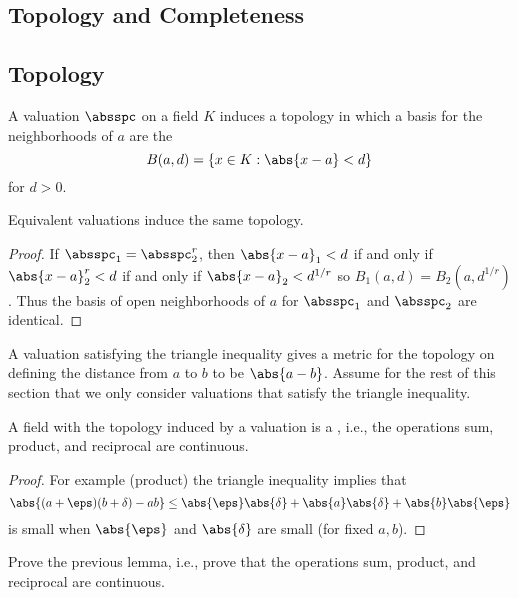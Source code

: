 \documentclass[11pt]{book}
\begin{document}
\begin{ch}
\chapter{Topology and  Completeness}

\section{Topology}\label{sec:topology}
A valuation $\absspc$ on a field $K$ induces a topology in which a
basis for the neighborhoods of $a$ are the 
$$
  B(a,d) = \{x\in K : \abs{x-a} < d\}
$$
for $d>0$.
\begin{lemma}
Equivalent valuations induce the same topology.
\end{lemma}
\begin{proof}
If $\absspc_1=\absspc_2^r$, then
$\abs{x-a}_1 < d$ if and only if
$\abs{x-a}_2^r<d$ if and only if
$\abs{x-a}_2<d^{1/r}$
so $B_1(a,d) = B_2(a,d^{1/r})$.
Thus the basis of open neighborhoods of $a$
for $\absspc_1$ and $\absspc_2$ are identical.
\end{proof}

A valuation satisfying the triangle inequality gives a metric for the
topology on defining the distance from $a$ to $b$ to be $\abs{a-b}$.
Assume for the rest of this section that we only consider valuations
that satisfy the triangle inequality.
\begin{lemma}
A field with the topology induced by a valuation is
a , i.e., the operations sum, product,
and reciprocal are continuous.
\end{lemma}
\begin{proof}
For example (product) the triangle inequality implies that
$$
  \abs{(a+\eps)(b+\delta) - ab}
   \leq \abs{\eps}\abs{\delta} + \abs{a}\abs{\delta}
     + \abs{b}\abs{\eps}
$$
     is small when $\abs{\eps}$ and $\abs{\delta}$ are
small (for fixed $a, b$).
\end{proof}
\begin{exercise}\label{ex:topology1}
Prove the previous lemma, i.e., prove that the operations sum, product,
and reciprocal are continuous.
\end{exercise}



\end{ch}
\end{document}
